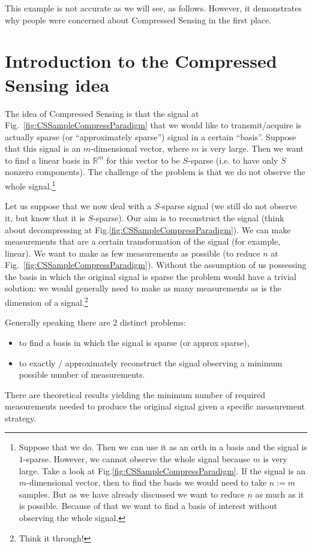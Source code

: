 \documentclass[11pt]{article}
\numberwithin{equation}{section}
\theoremstyle{definition}
\begin{document}
This example is not accurate as we will see, as follows.
However, it demonstrates why people were concerned about Compressed Sensing in the first place.


\section{Introduction to the Compressed Sensing idea}
The idea of Compressed Sensing is that the signal at Fig.~\ref{fig:CSSampleCompressParadigm} that we would like to transmit/acquire is actually sparse (or ``approximately sparse'') signal in a certain ``basis''.
Suppose that this signal is an $m$-dimensional vector, where $m$ is very large.
Then we want to find a linear basis in $\mathbb R^m$ for this vector to be $S$-sparse (i.e. to have only $S$ nonzero components).
The challenge of the problem is that we do not observe the whole signal.\footnote{
    Suppose that we do.
    Then we can use it as an orth in a basis and the signal is $1$-sparse.
    However, we cannot observe the whole signal because $m$ is very large.
    Take a look at Fig.\ref{fig:CSSampleCompressParadigm}.
    If the signal is an $m$-dimensional vector, then to find the basis we would need to take $n := m$ samples.
    But as we have already discussed we want to reduce $n$ as much as it is possible.
    Because of that we want to find a basis of interest without observing the whole signal.
}

Let us suppose that we now deal with a $S$-sparse signal (we still do not observe it, but know that it is $S$-sparse).
Our aim is to reconstruct the signal (think about decompressing at Fig.\ref{fig:CSSampleCompressParadigm}).
We can make measurements that are a certain transformation of the signal (for example, linear).
We want to make as few measurements as possible (to reduce $n$ at Fig.~\ref{fig:CSSampleCompressParadigm}).
Without the assumption of us possessing the basis in which the original signal is sparse the problem would have a trivial solution: we would generally need to make as many measurements as is the dimension of a signal.\footnote{Think it through!}

Generally speaking there are 2 distinct problems:
\begin{itemize}
    \item to find a basis in which the signal is sparse (or approx sparse),
    \item to exactly / approximately reconstruct the signal observing a minimum possible number of measurements.
\end{itemize}
There are theoretical results yielding the minimum number of required measurements needed to produce the original signal given a specific measurement strategy.
\end{document}
